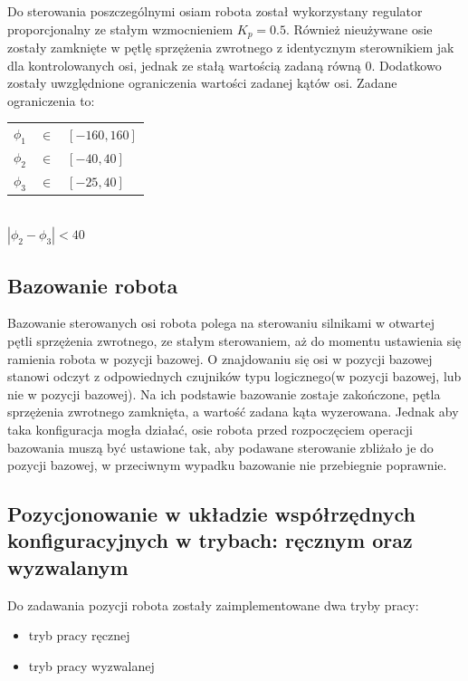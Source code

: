 \documentclass[12pt]{article}
\begin{document}
Do sterowania poszczególnymi osiam robota został wykorzystany regulator
proporcjonalny ze stałym wzmocnieniem $K_p = 0.5$. Również nieużywane osie
zostały zamknięte w pętlę sprzężenia zwrotnego z identycznym sterownikiem jak
dla kontrolowanych osi, jednak ze stałą wartością zadaną równą 0. Dodatkowo
zostały uwzględnione ograniczenia wartości zadanej kątów osi. Zadane
ograniczenia to:
\begin{center}
    \begin{tabular}{lll}
        $\phi_1$ & $\in$ & $[-160,160]$\\[0.1cm]
        $\phi_2$ & $\in$ & $[-40,40]$\\[0.1cm]
        $\phi_3$ & $\in$ & $[-25,40]$
    \end{tabular}\\[0.1cm]
    $|\phi_2-\phi_3|<40$
\end{center}

\newpage

\subsection{Bazowanie robota}

Bazowanie sterowanych osi robota polega na sterowaniu silnikami w otwartej pętli
sprzężenia zwrotnego, ze stałym sterowaniem, aż do momentu ustawienia się
ramienia robota w pozycji bazowej. O znajdowaniu się osi w pozycji bazowej
stanowi odczyt z odpowiednych czujników typu logicznego(w pozycji bazowej, lub
nie w pozycji bazowej). Na ich podstawie bazowanie zostaje zakończone, pętla
sprzężenia zwrotnego zamknięta, a wartość zadana kąta wyzerowana. Jednak aby
taka konfiguracja mogła działać, osie robota przed rozpoczęciem operacji
bazowania muszą być ustawione tak, aby podawane sterowanie zbliżało je do
pozycji bazowej, w przeciwnym wypadku bazowanie nie przebiegnie poprawnie.

\subsection{Pozycjonowanie w układzie współrzędnych konfiguracyjnych w trybach: ręcznym oraz
wyzwalanym}

Do zadawania pozycji robota zostały zaimplementowane dwa tryby pracy:

\begin{itemize}
  \item tryb pracy ręcznej
  \item tryb pracy wyzwalanej
\end{itemize}
\end{document}
